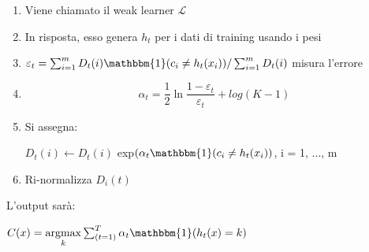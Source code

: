 \begin{enumerate}
\item Viene chiamato il weak learner \begin{math} \mathcal{L} \end{math}
 \item In risposta, esso genera \begin{math} h_t \end{math} per i dati di 
training usando i pesi
\item \begin{math} \varepsilon_t = \sum_{i=1}^m D_t(i) 
\mathbbm{1}(c_i\ne h_t(x_i))/\sum_{i=1}^m D_t(i)\end{math}   misura l'errore
\item \begin{equation} \label{eq:alg} 
\alpha_t=\frac{1}{2}\ln\frac{1-\varepsilon_t}{\varepsilon_t} + log(K-1) \end{equation} 

\item Si assegna:
\begin{center}
 \begin{math}
  D_t(i) \leftarrow D_t(i) 
 \end{math} exp\begin{math}
                (\alpha_t\mathbbm{1}(c_i\ne h_t(x_i))
               \end{math}, i = 1, ..., m


\end{center}

\item Ri-normalizza \begin{math}
                     D_i(t)
                    \end{math}


\end{enumerate}
L'output sar\`a:
\begin{center}
 \begin{math} C(x)= \underset{k}{\operatorname{argmax}}\sum_{(t=1)}^T \alpha_t  
\mathbbm{1}(h_t(x) = k)\end{math}
\end{center}


